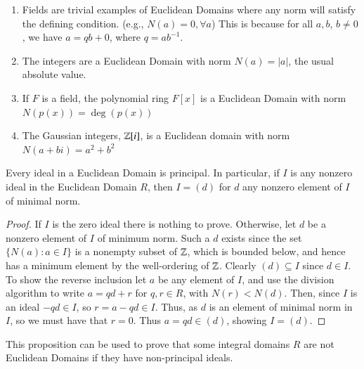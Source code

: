 \documentclass[12pt, a4paper, oneside, openright, titlepage]{book}
\begin{document}
\begin{eg}
    \leavevmode
    \begin{enumerate}
        \item Fields are trivial examples of Euclidean Domains where any norm will satisfy the defining condition. (e.g., $N(a) = 0,\forall a$) This is because for all $a,b$, $b\neq 0$, we have $a = qb+0$, where $q = ab^{-1}$.
        \item The integers are a Euclidean Domain with norm $N(a) = |a|$, the usual absolute value.
        \item If $F$ is a field, the polynomial ring $F[x]$ is a Euclidean Domain with norm $N(p(x)) = \deg(p(x))$
        \item The Gaussian integers, $\mathbb Z[i]$, is a Euclidean domain with norm $N(a+bi) = a^2+b^2$
    \end{enumerate}
\end{eg}


\begin{prop}
    Every ideal in a Euclidean Domain is principal. In particular, if $I$ is any nonzero ideal in the Euclidean Domain $R$, then $I = (d)$ for $d$ any nonzero element of $I$ of minimal norm.
\end{prop}
\begin{proof}
    If $I$ is the zero ideal there is nothing to prove. Otherwise, let $d$ be a nonzero element of $I$ of minimum norm. Such a $d$ exists since the set $\{N(a):a \in I\}$ is a nonempty subset of $\mathbb Z$, which is bounded below, and hence has a minimum element by the well-ordering of $\mathbb Z$. Clearly $(d) \subseteq I$ since $d \in I$. To show the reverse inclusion let $a$ be any element of $I$, and use the division algorithm to write $a = qd + r$ for $q,r \in R$, with $N(r) < N(d)$. Then, since $I$ is an ideal $-qd \in I$, so $r = a-qd \in I$. Thus, as $d$ is an element of minimal norm in $I$, so we must have that $r = 0$. Thus $a = qd \in (d)$, showing $I = (d)$.
\end{proof}

\begin{rmk}
    This proposition can be used to prove that some integral domains $R$ are not Euclidean Domains if they have non-principal ideals.
\end{rmk}
\end{document}
